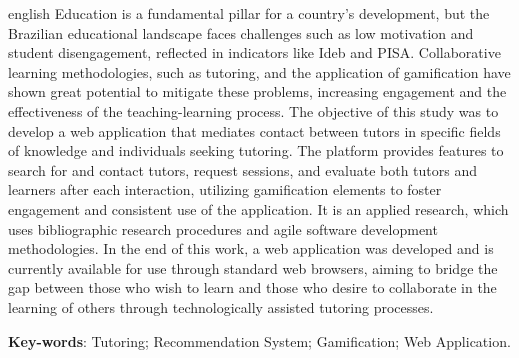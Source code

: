 \begin{resumo}[Abstract]
 \begin{otherlanguage*}{english}
    Education is a fundamental pillar for a country's development, but the Brazilian educational landscape faces challenges such as low motivation and student disengagement, reflected in indicators like Ideb and PISA. Collaborative learning methodologies, such as tutoring, and the application of gamification have shown great potential to mitigate these problems, increasing engagement and the effectiveness of the teaching-learning process. 
    The objective of this study was to develop a web application that mediates contact between tutors in specific fields of knowledge and individuals seeking tutoring. The platform provides features to search for and contact tutors, request sessions, and evaluate both tutors and learners after each interaction, utilizing gamification elements to foster engagement and consistent use of the application. It is an applied research, which uses bibliographic research procedures and agile software development methodologies. In the end of this work, a web application was developed and is currently available for use through standard web browsers, aiming to bridge the gap between those who wish to learn and those who desire to collaborate in the learning of others through technologically assisted tutoring processes.
   \vspace{\onelineskip}
 
   \noindent 
   \textbf{Key-words}: Tutoring; Recommendation System; Gamification; Web Application.
 \end{otherlanguage*}
\end{resumo}
